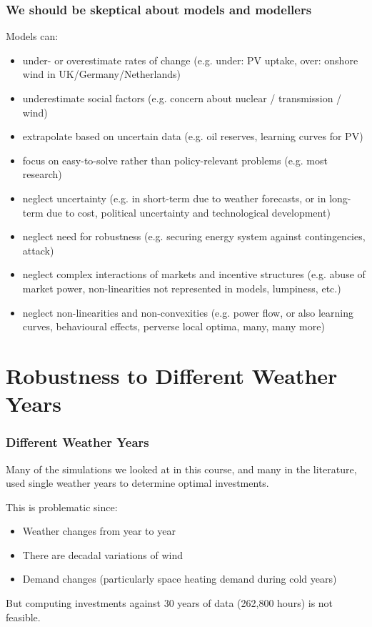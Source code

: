 \documentclass[10pt,aspectratio=169,dvipsnames]{beamer}
\let\olditem\item
\renewcommand{\item}{%
\olditem\vspace{5pt}}
\begin{document}
\begin{frame}
  \frametitle{We should be skeptical about models and modellers}

  Models can:
  \vspace{-.3cm}
    \begin{itemize}
    \item \alert{under- or overestimate rates of change} (e.g. under: PV uptake, over: onshore wind in UK/Germany/Netherlands)
    \item \alert{underestimate social factors} (e.g. concern about nuclear / transmission / wind)
    \item \alert{extrapolate based on uncertain data} (e.g. oil reserves, learning curves for PV)
    \item \alert{focus on easy-to-solve rather than policy-relevant problems} (e.g. most research)
    \item \alert{neglect uncertainty} (e.g. in short-term due to weather forecasts, or in long-term due to cost, political uncertainty and technological development)
    \item \alert{neglect need for robustness} (e.g. securing energy system against contingencies, attack)
    \item \alert{neglect complex interactions of markets and incentive structures} (e.g. abuse of market power, non-linearities not represented in models, lumpiness, etc.)
    \item \alert{neglect non-linearities and non-convexities} (e.g. power flow, or also learning curves, behavioural effects, perverse local optima, many, many more)
    \end{itemize}

\end{frame}


\section{Robustness to Different Weather Years}


\begin{frame}
  \frametitle{Different Weather Years}

  Many of the simulations we looked at in this course, and many in the literature, used single weather years to determine optimal investments.

  This is problematic since:
  \begin{itemize}
  \item Weather changes from year to year
  \item There are decadal variations of wind
  \item Demand changes (particularly space heating demand during cold years)
  \end{itemize}

  But computing investments against 30 years of data (262,800 hours) is not feasible.

\end{frame}
\end{document}
